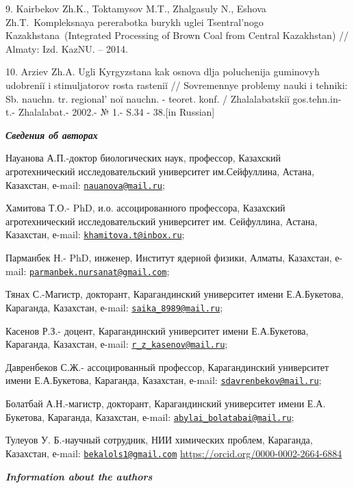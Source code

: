 9. Kairbekov Zh.K., Toktamysov M.T., Zhalgasuly N., Eshova
Zh.T.~Kompleksnaya pererabotka burykh uglei Tsentral'nogo
Kazakhstana~(Integrated Processing of Brown Coal from Central
Kazakhstan) // Almaty: Izd. KazNU. -- 2014.

10. Arziev Zh.A. Ugli Kyrgyzstana kak osnova dlja poluchenija guminovyh
udobreniĭ i stimuljatorov rosta rasteniĭ // Sovremennye problemy nauki i
tehniki: Sb. nauchn. tr. regional' noĭ nauchn. - teoret.
konf. / Zhalalabatskiĭ gos.tehn.in-t.- Zhalalabat.- 2002.- № 1.- S.34 -
38.{[}in Russian{]}

\emph{{\bfseries Сведения об авторах}}

Науанова А.П.-доктор биологических наук, профессор, Казахский
агротехнический исследовательский университет им.Сейфуллина, Астана,
Казахстан, е-mail:
\href{mailto:nauanova@mail.ru}{\nolinkurl{nauanova@mail.ru}};

Хамитова Т.О.- PhD, и.о. ассоцированного профессора, Казахский
агротехнический исследовательский университет им. Сейфуллина, Астана,
Казахстан, е-mail:
\href{mailto:khamitova.t@inbox.ru}{\nolinkurl{khamitova.t@inbox.ru}};

Парманбек Н.- PhD, инженер, Институт ядерной физики, Алматы, Казахстан,
е-mail:
\href{mailto:parmanbek.nursanat@gmail.com}{\nolinkurl{parmanbek.nursanat@gmail.com}};

Тянах С.-Магистр, докторант, Карагандинский университет имени
Е.А.Букетова, Караганда, Казахстан, е-mail:
\href{mailto:saika_8989@mail.ru}{\nolinkurl{saika\_8989@mail.ru}};

Касенов Р.З.- доцент, Карагандинский университет имени Е.А.Букетова,
Караганда, Казахстан, е-mail:
\href{mailto:r_z_kasenov@mail.ru}{\nolinkurl{r\_z\_kasenov@mail.ru}};

Давренбеков С.Ж.- ассоцированный профессор, Карагандинский университет
имени Е.А.Букетова, Караганда, Казахстан, е-mail:
\href{mailto:sdavrenbekov@mail.ru}{\nolinkurl{sdavrenbekov@mail.ru}};

Болатбай А.Н.-магистр, докторант, Карагандинский университет имени Е.А.
Букетова, Караганда, Казахстан, е-mail:
\href{mailto:abylai_bolatabai@mail.ru}{\nolinkurl{abylai\_bolatabai@mail.ru}};

Тулеуов У. Б.-научный сотрудник, НИИ химических проблем, Караганда,
Казахстан, е-mail:
\href{mailto:bekalols1@gmail.com}{\nolinkurl{bekalols1@gmail.com}}
\url{https://orcid.org/0000-0002-2664-6884}

\emph{{\bfseries Information about the authors}}

